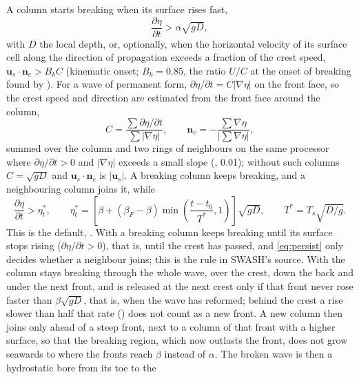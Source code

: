 A column starts breaking when its surface rises fast,
\begin{equation}
\frac{\partial\eta}{\partial t} > \alpha\sqrt{gD},
\label{eq:onset}
\end{equation}
with $D$ the local depth, or, optionally, when the horizontal velocity of its
surface cell along the direction of propagation exceeds a fraction of the
crest speed, $\bm{u}_s\cdot\bm{n}_c > B_k C$ (kinematic onset; $B_k = 0.85$,
the ratio $U/C$ at the onset of breaking found by \citet{barthelemy2018}).
For a wave of permanent form, $\partial\eta/\partial t = C|\nabla\eta|$ on the
front face, so the crest speed and direction are estimated from the front
face around the column,
\begin{equation}
  C = \frac{\sum \partial\eta/\partial t}{\sum |\nabla\eta|},\qquad
  \bm{n}_c = -\frac{\sum \nabla\eta}{|\sum \nabla\eta|},
  \label{eq:crestspeed}
\end{equation}
summed over the column and two rings of neighbours on the same processor
where $\partial\eta/\partial t > 0$ and $|\nabla\eta|$ exceeds a small slope
(, 0.01); without such columns $C = \sqrt{gD}$ and
$\bm{u}_s\cdot\bm{n}_c$ is $|\bm{u}_s|$. A breaking column
keeps breaking, and a neighbouring column joins it, while
\begin{equation}
\frac{\partial\eta}{\partial t} > \eta_t^*,\qquad
\eta_t^* = \left[\beta + (\beta_F - \beta)\min\!\left(\frac{t-t_0}{T^*},1\right)\right]\sqrt{gD},
\qquad T^* = T_s\sqrt{D/g}.
\label{eq:persist}
\end{equation}
This is the default, . With
 a breaking column keeps breaking until its surface
stops rising ($\partial\eta/\partial t > 0$), that is, until the crest has
passed, and \eqref{eq:persist} only decides whether a neighbour joins; this
is the rule in SWASH's source. With  the column
stays breaking through the whole wave, over the crest, down the back and
under the next front, and is released at the next crest only if that front
never rose faster than $\beta\sqrt{gD}$, that is, when the wave has
reformed; behind the crest a rise slower than half that rate
() does not count as a new front. A new column then
joins only ahead of a steep front, next to a column of that front with a
higher surface, so that the breaking region, which now outlasts the front,
does not grow seawards to where the fronts reach $\beta$ instead of
$\alpha$. The broken wave is then a hydrostatic bore from its toe to the
